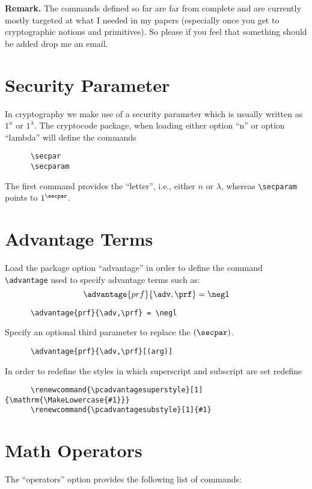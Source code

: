 \documentclass[a4paper]{report}
\begin{document}
  \textbf{Remark. } The commands defined so far are far from complete and are currently mostly targeted at what I needed in my
  papers (especially once you get to cryptographic notions and primitives). So please if you feel that something should be added
  drop me an email.
  
  \section{Security Parameter}
  In cryptography we make use of a security parameter which is usually written as $1^n$ or $1^\lambda$. The cryptocode
  package, when loading either option \enquote{n} or option \enquote{lambda} will define the commands
  \begin{lstlisting}
	  \secpar
	  \secparam
  \end{lstlisting}
  The first command provides the \enquote{letter}, i.e., either $n$ or $\lambda$, whereas \lstinline$\secparam$ points
  to $1^\secpar$.
  
  \section{Advantage Terms}
  Load the package option ``advantage'' in order to define the command \lstinline$\advantage$ used to specify advantage terms such as:
  \[
  \advantage{prf}{\adv,\prf} = \negl
  \]
  \begin{lstlisting}
	  \advantage{prf}{\adv,\prf} = \negl
  \end{lstlisting}
  Specify an optional third parameter to replace the $(\secpar)$. 
  \begin{lstlisting}
	  \advantage{prf}{\adv,\prf}[(arg)]
  \end{lstlisting}
  In order to redefine the styles in which superscript and subscript are set redefine
  \begin{lstlisting}
	  \renewcommand{\pcadvantagesuperstyle}[1]{\mathrm{\MakeLowercase{#1}}}
	  \renewcommand{\pcadvantagesubstyle}[1]{#1}
  \end{lstlisting}
  
  \section{Math Operators}
  The \enquote{operators} option provides the following list of commands:
  
\end{document}
